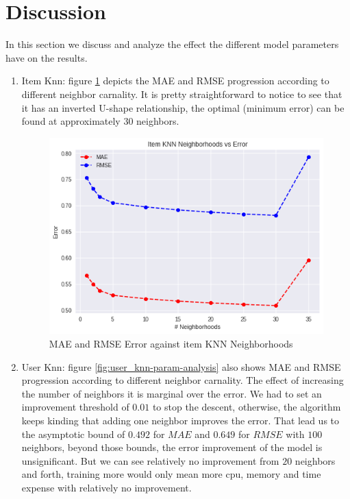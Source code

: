 \documentclass[letterpaper, 10 pt, conference]{ieeeconf}  %
\begin{document}
\section{Discussion}

In this section we discuss and analyze the effect the different model parameters have on the results.\\

\begin{enumerate}
    \item Item Knn: figure \ref{fig:item_knn-param-analysis} depicts the MAE and RMSE progression according to different neighbor carnality. It is pretty straightforward to notice to see that it has an inverted U-shape relationship, the optimal (minimum error) can be found at approximately 30 neighbors.
    
    \begin{figure}[h]
        \includegraphics[scale=0.4]{item_knn-param-analysis.png}
        \centering
        \caption{MAE and RMSE Error against item KNN Neighborhoods}
        \label{fig:item_knn-param-analysis}
    \end{figure}
        
    \item User Knn: figure \ref{fig:user_knn-param-analysis} also shows MAE and RMSE progression according to different neighbor carnality. The effect of increasing the number of neighbors it is marginal over the error. We had to set an improvement threshold of $0.01$ to stop the descent, otherwise, the algorithm keeps kinding that adding one neighbor improves the error. That lead us to the asymptotic bound of $0.492$ for $MAE$ and $0.649$ for $RMSE$ with $100$ neighbors, beyond those bounds, the error improvement of the model is unsignificant. But we can see relatively no improvement from $20$ neighbors and forth, training more would only mean more cpu, memory and time expense with relatively no improvement. 
    

\end{enumerate}
\end{document}
